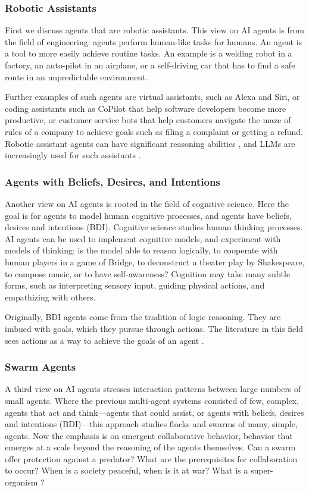 \subsubsection{Robotic Assistants}
First we discuss agents that are robotic assistants. 
This view on AI agents is from the field of engineering: agents perform human-like tasks for humans. An agent is a tool to more easily achieve routine tasks. An example is a welding robot in a factory, an auto-pilot in an airplane, or a self-driving car that has to find  a safe route in an unpredictable environment.

Further examples of such agents are virtual assistants, such as Alexa and Siri, or coding assistants such as CoPilot that help software developers become more productive, or customer service bots that help customers navigate the maze of rules of a company to achieve goals such as filing a complaint or getting a refund. Robotic assistant agents can have  significant reasoning abilities \citep{dorri2018multi}, and LLMs are increasingly used for such assistants \citep{plaat2025agentic}. 

\subsubsection{Agents with Beliefs, Desires, and Intentions}
Another view on AI agents is rooted in the field of cognitive science. Here the goal is for agents to model human cognitive processes, and agents have beliefs, desires and intentions (BDI). Cognitive science studies human thinking processes. AI agents can be used to implement cognitive models, and experiment with models of thinking: is the model able to reason logically, to cooperate with human players in a game of Bridge, to deconstruct a theater play by Shakespeare, to compose music, or to have self-awareness? Cognition may take many subtle forms, such as interpreting sensory input, guiding physical actions, and empathizing with others.

Originally, BDI agents come from the tradition of logic reasoning. They are imbued with goals, which they pursue through actions. The literature in this field sees actions as a way to achieve the goals of an agent \citep{rao1995bdi,georgeff1998belief}.

\subsubsection{Swarm Agents}
A third view on AI agents stresses interaction patterns between large numbers of small agents. Where the previous multi-agent systems consisted of few, complex, agents that act and think---agents that could assist, or agents with beliefs, desires and intentions (BDI)---this approach  studies flocks and swarms of many, simple, agents. Now the emphasis is on emergent collaborative  behavior, behavior that emerges at a scale beyond the reasoning of the agents themselves. Can a swarm offer protection against a predator? What are the prerequisites for collaboration to occur? When is a society peaceful, when is it at war? What is a super-organism \citep{johnson2010deconstructing,wilson1989reviving}?

